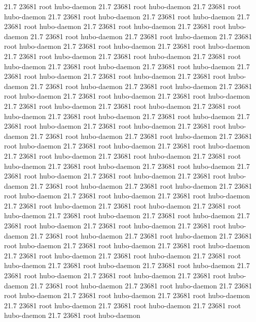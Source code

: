 21.7 23681 root     hubo-daemon
21.7 23681 root     hubo-daemon
21.7 23681 root     hubo-daemon
21.7 23681 root     hubo-daemon
21.7 23681 root     hubo-daemon
21.7 23681 root     hubo-daemon
21.7 23681 root     hubo-daemon
21.7 23681 root     hubo-daemon
21.7 23681 root     hubo-daemon
21.7 23681 root     hubo-daemon
21.7 23681 root     hubo-daemon
21.7 23681 root     hubo-daemon
21.7 23681 root     hubo-daemon
21.7 23681 root     hubo-daemon
21.7 23681 root     hubo-daemon
21.7 23681 root     hubo-daemon
21.7 23681 root     hubo-daemon
21.7 23681 root     hubo-daemon
21.7 23681 root     hubo-daemon
21.7 23681 root     hubo-daemon
21.7 23681 root     hubo-daemon
21.7 23681 root     hubo-daemon
21.7 23681 root     hubo-daemon
21.7 23681 root     hubo-daemon
21.7 23681 root     hubo-daemon
21.7 23681 root     hubo-daemon
21.7 23681 root     hubo-daemon
21.7 23681 root     hubo-daemon
21.7 23681 root     hubo-daemon
21.7 23681 root     hubo-daemon
21.7 23681 root     hubo-daemon
21.7 23681 root     hubo-daemon
21.7 23681 root     hubo-daemon
21.7 23681 root     hubo-daemon
21.7 23681 root     hubo-daemon
21.7 23681 root     hubo-daemon
21.7 23681 root     hubo-daemon
21.7 23681 root     hubo-daemon
21.7 23681 root     hubo-daemon
21.7 23681 root     hubo-daemon
21.7 23681 root     hubo-daemon
21.7 23681 root     hubo-daemon
21.7 23681 root     hubo-daemon
21.7 23681 root     hubo-daemon
21.7 23681 root     hubo-daemon
21.7 23681 root     hubo-daemon
21.7 23681 root     hubo-daemon
21.7 23681 root     hubo-daemon
21.7 23681 root     hubo-daemon
21.7 23681 root     hubo-daemon
21.7 23681 root     hubo-daemon
21.7 23681 root     hubo-daemon
21.7 23681 root     hubo-daemon
21.7 23681 root     hubo-daemon
21.7 23681 root     hubo-daemon
21.7 23681 root     hubo-daemon
21.7 23681 root     hubo-daemon
21.7 23681 root     hubo-daemon
21.7 23681 root     hubo-daemon
21.7 23681 root     hubo-daemon
21.7 23681 root     hubo-daemon
21.7 23681 root     hubo-daemon
21.7 23681 root     hubo-daemon
21.7 23681 root     hubo-daemon
21.7 23681 root     hubo-daemon
21.7 23681 root     hubo-daemon
21.7 23681 root     hubo-daemon
21.7 23681 root     hubo-daemon
21.7 23681 root     hubo-daemon
21.7 23681 root     hubo-daemon
21.7 23681 root     hubo-daemon
21.7 23681 root     hubo-daemon
21.7 23681 root     hubo-daemon
21.7 23681 root     hubo-daemon
21.7 23681 root     hubo-daemon
21.7 23681 root     hubo-daemon
21.7 23681 root     hubo-daemon
21.7 23681 root     hubo-daemon
21.7 23681 root     hubo-daemon
21.7 23681 root     hubo-daemon
21.7 23681 root     hubo-daemon
21.7 23681 root     hubo-daemon
